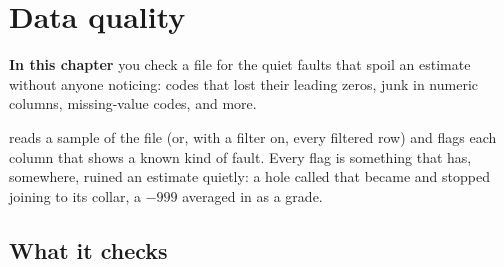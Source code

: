 \chapter{Data quality}\label{ch:dq}
\begin{goals}
\textbf{In this chapter} you check a file for the quiet faults that spoil an estimate without anyone
noticing: codes that lost their leading zeros, junk in numeric columns, missing-value codes, and more.
\end{goals}

 reads a sample of the file (or, with a filter on, every filtered row) and flags
each column that shows a known kind of fault. Every flag is something that has, somewhere, ruined an
estimate quietly: a hole called  that became  and stopped joining to its collar, a
$-999$ averaged in as a grade.


\section{What it checks}\label{sec:dq-checks}

